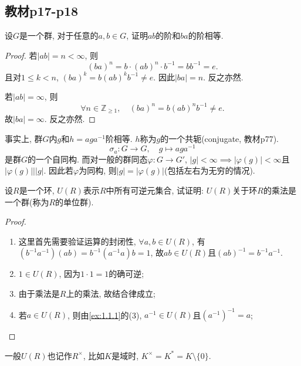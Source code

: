 \subsection{教材p17-p18}

\begin{problem}\label{ex:1.3.1}
    设$G$是一个群, 对于任意的$a, b \in G$, 证明$ab$的阶和$ba$的阶相等.
\end{problem}

\begin{proof}
    若$|ab| = n < \infty$, 则
    \[
        (ba)^n = b \cdot (ab)^n \cdot b^{-1} = bb^{-1} = e.
    \]
    且对$1 \leqslant k < n$, $(ba)^k = b(ab)^kb^{-1} \neq e$. 因此$|ba| = n$. 反之亦然.
    
    若$|ab| = \infty$, 则
    \[
        \forall n \in \mathbb{Z}_{\geqslant 1}, \quad (ba)^n = b(ab)^nb^{-1} \neq e.
    \]
    故$|ba| = \infty$. 反之亦然.
\end{proof}

\begin{remark}
    事实上, 群$G$内$g$和$h = aga^{-1}$阶相等. $h$称为$g$的一个共轭(conjugate, 教材p77).
    \[
        \sigma_a: G \to G, \quad g \mapsto aga^{-1}
    \]
    是群$G$的一个自同构. 而对一般的群同态$\varphi: G \to G'$, $|g| < \infty \implies |\varphi(g)| < \infty$且$|\varphi(g)| \Big| |g|$. 因此若$\varphi$为同构, 则$|g| = |\varphi(g)|$(包括左右为无穷的情况).
\end{remark}

\begin{problem}\label{ex:1.3.2}
    设$R$是一个环, $U(R)$表示$R$中所有可逆元集合, 试证明: $U(R)$关于环$R$的乘法是一个群(称为$R$的单位群).
\end{problem}

\begin{proof}
    \begin{enumerate}[(1)]
        \item 这里首先需要验证运算的封闭性, $\forall a, b \in U(R)$, 有$(b^{-1}a^{-1})(ab) = b^{-1}(a^{-1}a)b = 1$, 故$ab \in U(R)$且$(ab)^{-1} = b^{-1}a^{-1}$.
        \item $1 \in U(R)$, 因为$1 \cdot 1 = 1$的确可逆;
        \item 由于乘法是$R$上的乘法, 故结合律成立;
        \item 若$a \in U(R)$, 则由\ref{ex:1.1.1}的(3), $a^{-1} \in U(R)$且$(a^{-1})^{-1} = a$;
    \end{enumerate}
\end{proof}

\begin{remark}
    一般$U(R)$也记作$R^\times$, 比如$K$是域时, $K^\times = K^* =  K \setminus \{0\}$.
\end{remark}

